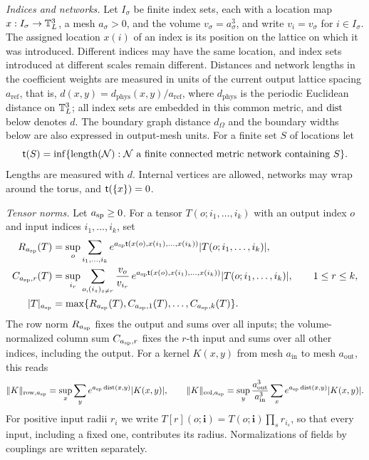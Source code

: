 \begin{definition}\label{ch01:def:analytic-norms}
\emph{Indices and networks.} Let $I_\sigma$ be finite index sets, each with a location map $x:I_\sigma\to\mathbb T_L^3$, a mesh $a_\sigma>0$, and the volume $v_\sigma=a_\sigma^3$, and write $v_i=v_\sigma$ for $i\in I_\sigma$. The assigned location $x(i)$ of an index is its position on the lattice on which it was introduced. Different indices may have the same location, and index sets introduced at different scales remain different. Distances and network lengths in the coefficient weights are measured in units of the current output lattice spacing $a_{\mathrm{ref}}$, that is, $d(x,y)=d_{\mathrm{phys}}(x,y)/a_{\mathrm{ref}}$, where $d_{\mathrm{phys}}$ is the periodic Euclidean distance on $\mathbb T_L^3$; all index sets are embedded in this common metric, and $\operatorname{dist}$ below denotes $d$. The boundary graph distance $d_\Omega$ and the boundary widths below are also expressed in output-mesh units. For a finite set $S$ of locations let
\[
 \mathsf t(S)=\inf\{\operatorname{length}(\mathcal N):\mathcal N\text{ a finite connected metric network containing }S\}.
\]
Lengths are measured with $d$. Internal vertices are allowed, networks may wrap around the torus, and $\mathsf t(\{x\})=0$.

\emph{Tensor norms.} Let $a_{\mathrm{sp}}\ge0$. For a tensor $T(o;i_1,\dots,i_k)$ with an output index $o$ and input indices $i_1,\dots,i_k$, set
\begin{equation}\label{ch01:eq:tensor-norm}
 \begin{aligned}
 R_{a_{\mathrm{sp}}}(T)&=\sup_o\sum_{i_1,\dots,i_k}e^{a_{\mathrm{sp}}\mathsf t(x(o),x(i_1),\dots,x(i_k))}\lvert T(o;i_1,\dots,i_k)\rvert,\\
 C_{a_{\mathrm{sp}},r}(T)&=\sup_{i_r}\sum_{o,(i_s)_{s\ne r}}\frac{v_o}{v_{i_r}}\,e^{a_{\mathrm{sp}}\mathsf t(x(o),x(i_1),\dots,x(i_k))}\lvert T(o;i_1,\dots,i_k)\rvert,\qquad1\le r\le k,\\
 \lvert T\rvert_{a_{\mathrm{sp}}}&=\max\{R_{a_{\mathrm{sp}}}(T),C_{a_{\mathrm{sp}},1}(T),\dots,C_{a_{\mathrm{sp}},k}(T)\}.
 \end{aligned}
\end{equation}
The row norm $R_{a_{\mathrm{sp}}}$ fixes the output and sums over all inputs; the volume-normalized column sum $C_{a_{\mathrm{sp}},r}$ fixes the $r$-th input and sums over all other indices, including the output. For a kernel $K(x,y)$ from mesh $a_{\mathrm{in}}$ to mesh $a_{\mathrm{out}}$, this reads
\[
 \lVert K\rVert_{\mathrm{row},a_{\mathrm{sp}}}=\sup_x\sum_ye^{a_{\mathrm{sp}}\operatorname{dist}(x,y)}\lvert K(x,y)\rvert,
 \qquad
 \lVert K\rVert_{\mathrm{col},a_{\mathrm{sp}}}=\sup_y\frac{a_{\mathrm{out}}^3}{a_{\mathrm{in}}^3}\sum_xe^{a_{\mathrm{sp}}\operatorname{dist}(x,y)}\lvert K(x,y)\rvert.
\]
For positive input radii $r_i$ we write $T[r](o;\mathbf i)=T(o;\mathbf i)\prod_{s}r_{i_s}$, so that every input, including a fixed one, contributes its radius. Normalizations of fields by couplings are written separately.


\end{definition}
